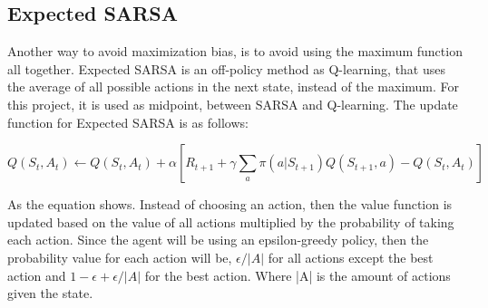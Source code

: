 \subsection{Expected SARSA} \label{sec:expected_sarsa}
Another way to avoid maximization bias, is to avoid using the maximum function all together. Expected SARSA is an off-policy method as Q-learning, that uses the average of all possible actions in the next state, instead of the maximum. For this project, it is used as midpoint, between SARSA and Q-learning. The update function for Expected SARSA is as follows:

\begin{equation}
    Q(S_t, A_t) \leftarrow Q(S_t, A_t) + \alpha \left[ R_{t+1} + \gamma \sum_a \pi(a|S_{t+1}) Q(S_{t+1}, a) - Q(S_t, A_t) \right]
\end{equation}

As the equation shows. Instead of choosing an action, then the value function is updated based on the value of all actions multiplied by the probability of taking each action. Since the agent will be using an epsilon-greedy policy, then the probability value for each action will be, $\epsilon / |A|$ for all actions except the best action and $1 - \epsilon + \epsilon / |A|$ for the best action. Where |A| is the amount of actions given the state. 
